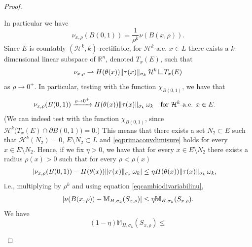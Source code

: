 \documentclass{article}
\numberwithin{equation}{section}
\theoremstyle{plain}%
\theoremstyle{definition}
\theoremstyle{definition}
\newcommand{\rgrande}{\mathbb{R}}
\newcommand{\haus}{\mathcal{H}}
\newcommand{\massaanisotropa}{\mathbb{M}_{H,\sigma_k}}
\newcommand{\mrestr}{\mathop{\hbox{\vrule height 7pt width 0.5pt depth 0pt
\vrule height 0.5pt width 6pt depth 0pt}}\nolimits}
\DeclarePairedDelimiter{\norma}{\lVert}{\rVert} %
\DeclarePairedDelimiter{\valass}{\lvert}{\rvert} %
\begin{document}
\begin{proof}
\begin{enumerate}
\begin{equation*}
        \end{equation*}
        In particular we have
    \begin{equation}\label{eqcambiodivariabilinu}
            \nu_{x,\rho} (B(0,1)) =
            \frac{1}{\rho^k} \nu (B(x,\rho))
            \text{.}
        \end{equation}
        Since $E$ is countably $(\haus^k,k)$-rectifiable, for $\haus^k$-a.e. $x \in L$ there exists a $k$-dimensional linear subspace of $\rgrande^n$, denoted $T_x (E)$, such that
        $$
        \nu_{x,\rho} \rightharpoonup H(\theta(x)) \norma{\tau(x)}_{\sigma_k} \, \haus^k \mrestr T_x (E)
        $$
        as $\rho \to 0^+$.
        In particular, testing with the function $ \chi_{B(0,1)}$, we have that
        \begin{equation}\label{eqprimaconvdimisure}
        \begin{split}
        \nu_{x,\rho} (B(0,1)) &
        \xrightarrow[]{\rho \to 0^+} H(\theta (x)) \norma{\tau(x)}_{\sigma_k} \, \omega_k \quad \text{for $\haus^k$-a.e. $x \in E$.}
        \end{split}
        \end{equation}
        (We can indeed test with the function $ \chi_{B(0,1)}$, since
$\haus^k\bigl(T_x(E)\cap \partial B(0,1)\bigr)=0$.)
        This means that there exists a set $N_2 \subset E$ such that $\haus^k(N_2) = 0 $, $E \setminus N_2 \subset L$ and \eqref{eqprimaconvdimisure} holds for every $x \in E \setminus N_2$. Hence, if we fix $\eta >0$, we have that for every $x \in E \setminus N_2$ there exists a radius $\rho(x) >0$ such that for every $\rho < \rho(x)$
        \begin{equation}\label{eq1}
        \begin{split}
        \valass{\nu_{x,\rho}(B(0,1)) - H(\theta (x)) \norma{\tau(x)}_{\sigma_k} \, \omega_k} &
        \leq
        \eta
        H(\theta (x)) \norma{\tau(x)}_{\sigma_k} \, \omega_k
        \text{,}
        \end{split}
        \end{equation}
        i.e., multiplying by $\rho^k$ and using equation \eqref{eqcambiodivariabilinu},
        \begin{equation}
            \valass{\nu(B(x,\rho)) - \massaanisotropa(S_{x,\rho})}
        \leq
        \eta
        \massaanisotropa(S_{x,\rho})
        \text{.}
        \end{equation}
        We have
        \begin{equation*}
            (1- \eta) \massaanisotropa (S_{x,\rho}) \leq

\end{equation*}
\end{enumerate}
\end{proof}
\end{document}
